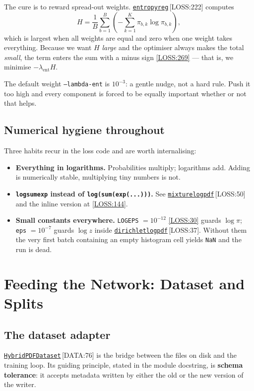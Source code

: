 \documentclass[11pt,a4paper]{report}
\newcommand{\srcbase}{vscode://file/Users/syellapa/Documents/Research/2026/ANSYS/Multi-ScalarPDF}
\newcommand{\dmdn}{dirichlet\string_mdn}
\newcommand{\srctag}[1]{{\footnotesize\textcolor{TagGray}{[#1]}}}
\newcommand{\Loss}[2]{\href{\srcbase/\dmdn/losses.py:#1}{\texttt{#2}}\,\srctag{LOSS:#1}}
\newcommand{\LossL}[1]{\href{\srcbase/\dmdn/losses.py:#1}{\srctag{LOSS:#1}}}
\newcommand{\Data}[2]{\href{\srcbase/\dmdn/data.py:#1}{\texttt{#2}}\,\srctag{DATA:#1}}
\newcommand{\code}[1]{\texttt{#1}}
\newcommand{\term}[1]{\textbf{#1}}
\renewcommand{\_}{\origtextunderscore\allowbreak}
\begin{document}
The cure is to reward spread-out weights. \Loss{222}{entropy\_reg} computes
\[
  H = \frac{1}{B}\sum_{b=1}^{B}\left(-\sum_{k=1}^{K}\pi_{b,k}\log \pi_{b,k}\right),
\]
which is largest when all weights are equal and zero when one weight takes everything. Because
we want $H$ \emph{large} and the optimiser always makes the total \emph{small}, the term enters
the sum with a minus sign \LossL{269} --- that is, we minimise $-\lambda_{\text{ent}} H$.

The default weight \code{--lambda-ent} is $10^{-3}$: a gentle nudge, not a hard rule. Push it
too high and every component is forced to be equally important whether or not that helps.

\section{Numerical hygiene throughout}

Three habits recur in the loss code and are worth internalising:

\begin{itemize}
  \item \textbf{Everything in logarithms.} Probabilities multiply; logarithms add. Adding is
        numerically stable, multiplying tiny numbers is not.
  \item \textbf{\code{logsumexp} instead of \code{log(sum(exp(...)))}.} See
        \Loss{50}{mixture\_logpdf} and the inline version at \LossL{144}.
  \item \textbf{Small constants everywhere.} \code{LOG\_EPS} $= 10^{-12}$ \LossL{30} guards
        $\log \pi$; \code{eps} $= 10^{-7}$ guards $\log z$ inside
        \Loss{37}{dirichlet\_logpdf}. Without them the very first batch containing an empty
        histogram cell yields \code{NaN} and the run is dead.
\end{itemize}

\chapter{Feeding the Network: Dataset and Splits}
\label{ch:splits}

\section{The dataset adapter}

\Data{76}{HybridPDFDataset} is the bridge between the files on disk and the training loop. Its
guiding principle, stated in the module docstring, is \term{schema tolerance}: it accepts
metadata written by either the old or the new version of the writer.
\end{document}
